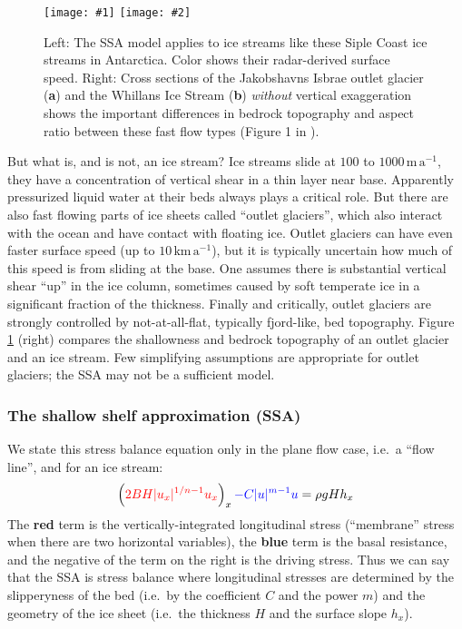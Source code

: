\documentclass[titlepage,letterpaper,final,12pt]{scrartcl}
\newcommand{\twofigsizes}[5]{
\begin{figure}[ht]
\centering
\texttt{[image: \#1]} \quad
\texttt{[image: \#2]}
\caption{#3}
\label{fig:#1}
\end{figure}}
\begin{document}
\twofigsizes{siple}{streamisbrae}{Left:  The SSA model applies to ice streams like these Siple Coast ice streams in Antarctica.  Color shows their radar-derived surface speed.  Right: Cross sections of the Jakobshavns Isbrae outlet glacier (\textbf{a}) and the Whillans Ice Stream (\textbf{b}) \emph{without} vertical exaggeration shows the important differences in bedrock topography and aspect ratio between these fast flow types (Figure 1 in \cite{TrufferEchelmeyer}).}{2.8in}{2.9in}

But what is, and is not, an ice stream?  Ice streams slide at $100$ to $1000 \,\text{m}\,\text{a}^{-1}$, they have a concentration of vertical shear in a thin layer near base.  Apparently pressurized liquid water at their beds always plays a critical role.  But there are also fast flowing parts of ice sheets called ``outlet glaciers'', which also interact with the ocean and have contact with floating ice.  Outlet glaciers can have even faster surface speed (up to $10 \,\text{km}\,\text{a}^{-1}$), but it is typically uncertain how much of this speed is from sliding at the base.  One assumes there is substantial vertical shear ``up'' in the ice column, sometimes caused by soft temperate ice in a significant fraction of the thickness.  Finally and critically, outlet glaciers are strongly controlled by not-at-all-flat, typically fjord-like, bed topography.  Figure \ref{fig:siple} (right) compares the shallowness and bedrock topography of an outlet glacier and an ice stream.  Few simplifying assumptions are appropriate for outlet glaciers; the SSA may not be a sufficient model.

\subsubsection*{The shallow shelf approximation (SSA)}  We state this stress balance equation only in the plane flow case, i.e.~a ``flow line'', and for an ice stream:
\begin{equation}
  \left({\color{red} 2 B H |u_x|^{1/n - 1} u_x}\right)_x {\color{blue} - C|u|^{m-1}u} = \rho g H h_x \label{ssaearly}
\end{equation}
The {\color{red} \textbf{red} term} is the vertically-integrated longitudinal stress (``membrane'' stress when there are two horizontal variables), the {\color{blue} \textbf{blue} term} is the basal resistance, and the negative of the term on the right is the driving stress.  Thus we can say that the SSA is stress balance where longitudinal stresses are determined by the slipperyness of the bed (i.e.~by the coefficient $C$ and the power $m$) and the geometry of the ice sheet (i.e.~the thickness $H$ and the surface slope $h_x$).
\end{document}
